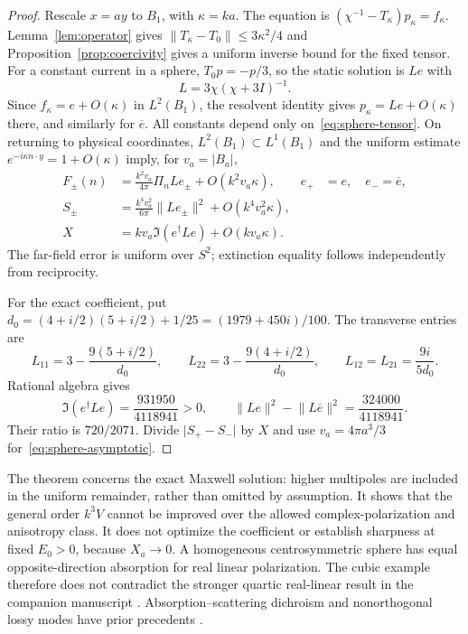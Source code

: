 \documentclass[11pt]{article}
\newcommand{\norm}[1]{\lVert #1\rVert}
\newcommand{\abs}[1]{\lvert #1\rvert}
\begin{document}
\begin{proof}
Rescale $x=ay$ to $B_1$, with $\kappa=ka$. The equation is $(\chi^{-1}-T_\kappa)p_\kappa=f_\kappa$. Lemma~\ref{lem:operator} gives $\norm{T_\kappa-T_0}\leq3\kappa^2/4$ and Proposition~\ref{prop:coercivity} gives a uniform inverse bound for the fixed tensor. For a constant current in a sphere, $T_0p=-p/3$, so the static solution is $Le$ with
\[
 L=3\chi(\chi+3I)^{-1}.
\]
Since $f_\kappa=e+O(\kappa)$ in $L^2(B_1)$, the resolvent identity gives $p_\kappa=Le+O(\kappa)$ there, and similarly for $\overline e$. All constants depend only on~\eqref{eq:sphere-tensor}. On returning to physical coordinates, $L^2(B_1)\subset L^1(B_1)$ and the uniform estimate $e^{-i\kappa n\cdot y}=1+O(\kappa)$ imply, for $v_a=\abs{B_a}$,
\begin{align*}
 F_\pm(n)&=\frac{k^2v_a}{4\pi}\Pi_nLe_\pm+O(k^2v_a\kappa),
 &e_+&=e,\quad e_-=\overline e,\\
 S_\pm&=\frac{k^4v_a^2}{6\pi}\norm{Le_\pm}^2+O(k^4v_a^2\kappa),\\
 X&=kv_a\Im(e^\dagger Le)+O(kv_a\kappa).
\end{align*}
The far-field error is uniform over $S^2$; extinction equality follows independently from reciprocity.

For the exact coefficient, put $d_0=(4+i/2)(5+i/2)+1/25=(1979+450i)/100$. The transverse entries are
\[
 L_{11}=3-\frac{9(5+i/2)}{d_0},\qquad
 L_{22}=3-\frac{9(4+i/2)}{d_0},\qquad
 L_{12}=L_{21}=\frac{9i}{5d_0}.
\]
Rational algebra gives
\begin{equation}\label{eq:sphere-rationals}
 \Im(e^\dagger Le)=\frac{931950}{4118941}>0,\qquad
 \norm{Le}^2-\norm{L\overline e}^2=\frac{324000}{4118941}.
\end{equation}
Their ratio is $720/2071$. Divide $\abs{S_+-S_-}$ by $X$ and use $v_a=4\pi a^3/3$ for~\eqref{eq:sphere-asymptotic}.
\end{proof}

The theorem concerns the exact Maxwell solution: higher multipoles are included in the uniform remainder, rather than omitted by assumption. It shows that the general order $k^3V$ cannot be improved over the allowed complex-polarization and anisotropy class. It does not optimize the coefficient or establish sharpness at fixed $E_0>0$, because $X_a\to0$. A homogeneous centrosymmetric sphere has equal opposite-direction absorption for real linear polarization. The cubic example therefore does not contradict the stronger quartic real-linear result in the companion manuscript \citep{WangZhengQuartic2026}. Absorption--scattering dichroism and nonorthogonal lossy modes have prior precedents \citep{Hopkins2015,Hopkins2016}.
\end{document}
